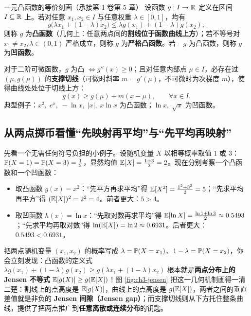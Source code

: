 \begin{recallBox}{一元凸函数的等价刻画（承接第 1 卷第 5 章）}
设函数 $g: I \to \mathbb{R}$ 定义在区间 $I \subseteq \mathbb{R}$ 上。若对任意 $x_1, x_2 \in I$ 与任意权重 $\lambda \in [0, 1]$，均有
\[
  g\bigl(\lambda x_1 + (1-\lambda) x_2\bigr) \le \lambda g(x_1) + (1-\lambda) g(x_2),
\]
则称 $g$ 为\textbf{凸函数}（几何上：任意两点间的\textbf{割线位于函数曲线上方}）；若不等号对 $x_1 \neq x_2, \lambda \in (0,1)$ 严格成立，则称 $g$ 为\textbf{严格凸函数}。若 $-g$ 为凸函数，则称 $g$ 为\textbf{凹函数}。

对于二阶可微函数，$g$ 为凸 $\iff g''(x) \ge 0$；且对任意内部点 $\mu \in I$，必存在过 $(\mu, g(\mu))$ 的\textbf{支撑切线}（可微时斜率 $m = g'(\mu)$，不可微时为次梯度 $m$），使得曲线处处位于切线上方：
\begin{equation}
  g(x) \ge g(\mu) + m(x - \mu), \qquad \forall x \in I. \label{eq:ch3-supporting-line}
\end{equation}
典型例子：$x^2,\; e^x,\; -\ln x,\; |x|,\; x\ln x$ 为凸函数；$\ln x,\; \sqrt{x}$ 为凹函数。
\end{recallBox}

\subsection{从两点掷币看懂“先映射再平均”与“先平均再映射”}

先看一个无需任何符号负担的小例子。设随机变量 $X$ 以相等概率取值 $1$ 或 $3$：$\mathbb{P}(X=1) = \mathbb{P}(X=3) = \tfrac{1}{2}$，显然均值 $\mathbb{E}[X] = \tfrac{1+3}{2} = 2$。现在分别考察一个凸函数和一个凹函数：
\begin{itemize}
  \item 取凸函数 $g(x) = x^2$：“先平方再求平均”得 $\mathbb{E}[X^2] = \tfrac{1^2 + 3^2}{2} = 5$；“先求平均再平方”得 $(\mathbb{E}[X])^2 = 2^2 = 4$。前者更大：$5 > 4$。
  \item 取凹函数 $h(x) = \ln x$：“先取对数再求平均”得 $\mathbb{E}[\ln X] = \tfrac{\ln 1 + \ln 3}{2} \approx 0.5493$；“先求平均再取对数”得 $\ln(\mathbb{E}[X]) = \ln 2 \approx 0.6931$。后者更大：$0.5493 < 0.6931$。
\end{itemize}

把两点随机变量 $(x_1, x_2)$ 的概率写成 $\lambda = \mathbb{P}(X = x_1)$、$1-\lambda = \mathbb{P}(X = x_2)$，你会立刻发现：凸函数的定义式 $\lambda g(x_1) + (1-\lambda) g(x_2) \ge g(\lambda x_1 + (1-\lambda) x_2)$ 根本就是\textbf{两点分布上的 Jensen 不等式} $\mathbb{E}[g(X)] \ge g(\mathbb{E}[X])$！图 \ref{fig:ch3-jensen} 把这一几何机制画得一清二楚：割线上的点高度是 $\mathbb{E}[g(X)]$，曲线上的点高度是 $g(\mathbb{E}[X])$，两者之间的垂直差值就是非负的 \textbf{Jensen 间隙（Jensen gap）}；而支撑切线则从下方托住整条曲线，提供了把两点推广到\textbf{任意离散或连续分布}的钥匙。

